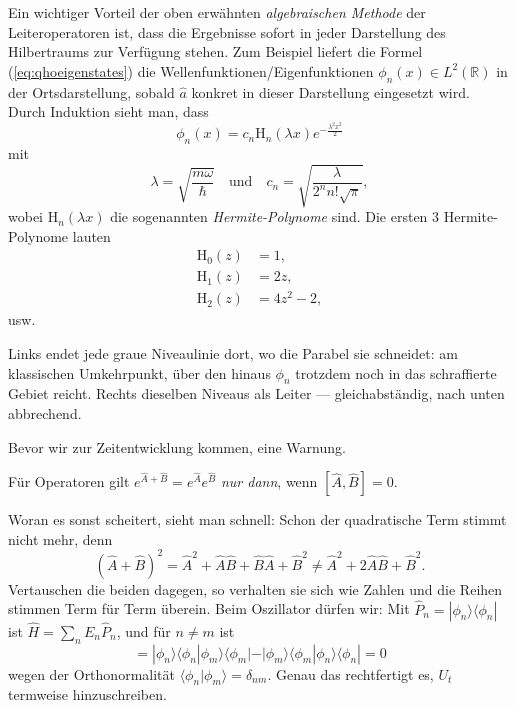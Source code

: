 Ein wichtiger Vorteil der oben erwähnten \emph{algebraischen Methode} der Leiteroperatoren ist,
dass die Ergebnisse sofort in jeder Darstellung des Hilbertraums zur Verfügung stehen. Zum Beispiel liefert die Formel (\ref{eq:qhoeigenstates}) die Wellenfunktionen/Eigenfunktionen $\phi_n(x) \in L^2(\mathbb{R})$ in der Ortsdarstellung, sobald $\widehat{a}$ konkret in dieser Darstellung eingesetzt wird. Durch Induktion sieht man, dass 
\begin{equation}
	\phi_n(x) = c_n \mathrm{H}_n(\lambda x)  e^{-\frac{\lambda^2 x^2}{2}}
\end{equation}
mit
\begin{equation}
	\lambda = \sqrt{\frac{m\omega}{\hbar}}\quad \text{und} \quad c_n = \sqrt{\frac{\lambda}{2^n n!\sqrt{\pi}}},
\end{equation}
wobei
$\mathrm{H}_n(\lambda x)$ die sogenannten \emph{Hermite-Polynome} sind. Die ersten $3$ Hermite-Polynome
lauten
\begin{align}
	\mathrm{H}_0(z) &= 1,\\
	\mathrm{H}_1(z) &= 2z,\\
	\mathrm{H}_2(z) &= 4z^2-2,
\end{align}
usw.



Links endet jede graue Niveaulinie dort, wo die Parabel sie schneidet: am
klassischen Umkehrpunkt, über den hinaus $\phi_n$ trotzdem noch in das
schraffierte Gebiet reicht. Rechts dieselben Niveaus als Leiter ---
gleichabständig, nach unten abbrechend.

Bevor wir zur Zeitentwicklung kommen, eine Warnung.

\begin{merksatz}
Für Operatoren gilt $e^{\widehat{A}+\widehat{B}} = e^{\widehat{A}}e^{\widehat{B}}$ \emph{nur dann}, wenn $[\widehat{A},\widehat{B}] = 0$.
\end{merksatz}

Woran es sonst scheitert, sieht man schnell: Schon der quadratische Term stimmt nicht mehr, denn
\begin{equation}
	(\widehat{A}+\widehat{B})^2 = \widehat{A}^2 + \widehat{A}\widehat{B} + \widehat{B}\widehat{A} + \widehat{B}^2
	\neq \widehat{A}^2 + 2\widehat{A}\widehat{B} + \widehat{B}^2.
\end{equation}
Vertauschen die beiden dagegen, so verhalten sie sich wie Zahlen und die Reihen stimmen Term für Term überein. Beim Oszillator dürfen wir: Mit $\widehat{P}_n = |\phi_n\rangle\langle\phi_n|$ ist $\widehat{H} = \sum_n E_n\widehat{P}_n$, und für $n \neq m$ ist
\begin{equation}
	[\widehat{P}_n,\widehat{P}_m] = |\phi_n\rangle\langle\phi_n|\phi_m\rangle\langle\phi_m|
	- |\phi_m\rangle\langle\phi_m|\phi_n\rangle\langle\phi_n| = 0
\end{equation}
wegen der Orthonormalität $\langle\phi_n|\phi_m\rangle = \delta_{nm}$. Genau das rechtfertigt es, $U_t$ termweise hinzuschreiben.

